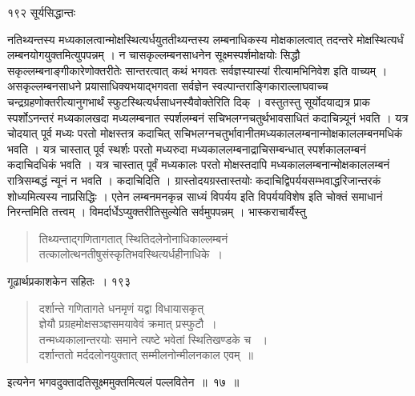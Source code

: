 \documentclass[11pt, openany]{book}
\begin{document}
\newpage

\noindent १९२ \hspace{4cm} सूर्यसिद्धान्तः
\vspace{1cm}


\begin{sloppypar}
\noindent नतिथ्यन्तस्य मध्यकालत्वान्मोक्षस्थित्यर्धयुततीथ्यन्तस्य लम्बनाधिकस्य मोक्षकालत्वात् तदन्तरे मोक्षस्थित्यर्धं लम्बनयोगयुक्तमित्युपपन्नम् । न चासकृल्लम्बनसाधनेन सूक्ष्मस्पर्शमोक्षयोः सिद्धौ सकृल्लम्बनाङ्गीकारेणोक्तरीतेः सान्तरत्वात् कथं भगवतः सर्वज्ञस्यास्यां रीत्यामभिनिवेश इति वाच्यम् । असकृल्लम्बनसाधने प्रयासाधिक्यभयाद्भगवता सर्वज्ञेन स्वल्पान्तराङ्गिकाराल्लाघवाच्च चन्द्रग्रहणोक्तरीत्यानुगभार्थं स्फुटस्थित्यर्धसाधनस्यैवोक्तेरिति दिक् । वस्तुतस्तु सूर्योदयाद्यत्र प्राक स्पर्शोऽनन्तरं मध्यकालखदा मध्यलम्बनात स्पर्शलम्बनं सचिभलग्नचतुर्थभावसाधितं कदाचिन्न्यूनं भवति । यत्र चोदयात् पूर्व मध्यः परतो मोक्षस्तत्र कदाचित् सचिभलग्नचतुर्भावानीतमध्यकाललम्बनान्मोक्षकाललम्बनमधिकं भवति । यत्र चास्तात् पूर्व स्थर्शः परतो मध्यरुदा मध्यकाललम्बनाद्राचिसम्बन्धात् स्पर्शकाललम्बनं कदाचिदधिकं भवति । यत्र चास्तात् पूर्वं मध्यकालः परतो मोक्षस्तदापि मध्यकाललम्बनान्मोक्षकाललम्बनं रात्रिसम्बद्धं न्यूनं न भवति । कदाचिदिति । ग्रास्तोदयग्रस्तास्तयोः कदाचिद्विपर्ययसम्भवाद्धरिजान्तरकं शोध्यमित्यस्य नाप्रसिद्धिः । एतेन लम्बनमनकृन्न साध्यं विपर्यय इति विपर्ययविशेष इति चोक्तं समाधानं निरन्तमिति तत्त्वम् । विमर्दार्धेऽप्युक्तरीतिसुल्येति सर्वमुपपन्नम् । भास्कराचार्यैस्तु\textendash
\end{sloppypar}


\begin{quote}
 {\qt तिथ्यन्ताद्गणितागतात् स्थितिदलेनोनाधिकाल्लम्बनं\\
 तत्कालोत्थनतीषुसंस्कृतिभवस्थित्यर्धहीनाधिके~।}
 \end{quote}

\newpage




\hspace{3cm} गूढार्थप्रकाशकेन सहितः~। \hfill १९३
\vspace{1cm}



\begin{quote}
 {\qt दर्शान्ते गणितागते धनमृणं यद्वा विधायासकृत्\\
 ज्ञेयौ प्रग्रहमोक्षसञ्ज्ञसमयावेवं क्रमात् प्रस्फुटौ~।\\
 तन्मध्यकालान्तरयोः समाने त्यष्टे भवेतां स्थितिखण्डके च ~।\\
 दर्शान्ततो मर्ददलोनयुक्तात् सम्मीलनोन्मीलनकाल एवम्~॥}
 \end{quote}
 {\setlength{\parindent}{5em}
इत्यनेन भगवदुक्तादतिसूक्ष्ममुक्तमित्यलं पल्लवितेन~॥~१७~॥}
\end{document}
